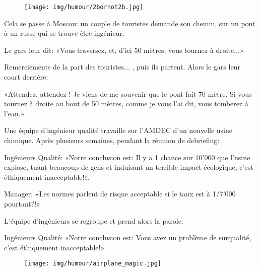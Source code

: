 	\begin{figure}[H]
		\centering
		\texttt{[image: img/humour/2bornot2b.jpg]}
	\end{figure}
	
\begin{center}\underline{\hspace{5 cm}}\end{center}

Cela se passe à Moscou: un couple de touristes demande son chemin, sur un pont à un russe qui se trouve être ingénieur.

Le gars leur dit: «Vous traversez, et, d'ici 50 mètres, vous tournez à droite...»

Remerciements de la part des touristes... , puis ils partent. Alors le gars leur court derrière:

«Attendez, attendez ! Je viens de me souvenir que le pont fait 70 mètre. Si vous tournez à droite au bout de 50 mètres, comme je vous l'ai dit, vous tomberez à l'eau.»

\begin{center}\underline{\hspace{5 cm}}\end{center}

Une équipe d'ingénieur qualité travaille sur l'AMDEC d'un nouvelle usine chimique. Après plusieurs semaines, pendant la réunion de debriefing:

Ingénieurs Qualité: «Notre conclusion est: Il y a 1 chance sur 10'000 que l'usine explose, tuant beaucoup de gens et induisant un terrible impact écologique, c'est éthiquement inacceptable!».

Manager: «Les normes parlent de risque acceptable si le taux est à 1/7'000 pourtant?!»

L'équipe d'ingénieurs se regroupe et prend alors la parole:

Ingénieurs Qualité: «Notre conclusion est: Vous avez un problème de surqualité, c'est éthiquement inacceptable!»

\begin{center}\underline{\hspace{5 cm}}\end{center}

	\begin{figure}[H]
		\centering
		\texttt{[image: img/humour/airplane\_magic.jpg]}
	\end{figure}

\begin{center}\underline{\hspace{5 cm}}\end{center}

